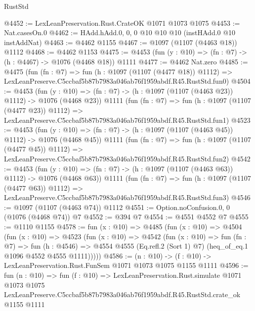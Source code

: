 \begin{lexlean}{RustStd}
\begin{coremodule}
@4452 := LexLeanPreservation.Rust.CrateOK @1071 @1073 @1075
@4453 := Nat.casesOn.{0}
@4462 := HAdd.hAdd.{0, 0, 0} @10 @10 @10 (instHAdd.{0} @10 instAddNat)
@4463 := @4462 @1155
@4467 := @1097 (@1107 (@4463 @18)) @1112
@4468 := @4462 @1153
@4475 := @4453 (fun (y : @10) => (fn : @7) -> (h : @4467) -> @1076 (@4468 @18)) @1111
@4477 := @4462 Nat.zero
@4485 := @4475
    (fun (fn : @7) =>
    fun (h : @1097 (@1107 (@4477 @18)) @1112) =>
    LexLeanPreserve.C5ccbaf5b87b7983a046ab76f1959abdf.R45.RustStd.fun0)
@4504 := @4453
    (fun (y : @10) => (fn : @7) -> (h : @1097 (@1107 (@4463 @23)) @1112) -> @1076 (@4468 @23))
    @1111
    (fun (fn : @7) =>
    fun (h : @1097 (@1107 (@4477 @23)) @1112) =>
    LexLeanPreserve.C5ccbaf5b87b7983a046ab76f1959abdf.R45.RustStd.fun1)
@4523 := @4453
    (fun (y : @10) => (fn : @7) -> (h : @1097 (@1107 (@4463 @45)) @1112) -> @1076 (@4468 @45))
    @1111
    (fun (fn : @7) =>
    fun (h : @1097 (@1107 (@4477 @45)) @1112) =>
    LexLeanPreserve.C5ccbaf5b87b7983a046ab76f1959abdf.R45.RustStd.fun2)
@4542 := @4453
    (fun (y : @10) => (fn : @7) -> (h : @1097 (@1107 (@4463 @63)) @1112) -> @1076 (@4468 @63))
    @1111
    (fun (fn : @7) =>
    fun (h : @1097 (@1107 (@4477 @63)) @1112) =>
    LexLeanPreserve.C5ccbaf5b87b7983a046ab76f1959abdf.R45.RustStd.fun3)
@4546 := @1097 (@1107 (@4463 @74)) @1112
@4551 := Option.noConfusion.{0, 0} (@1076 (@4468 @74)) @7
@4552 := @394 @7
@4554 := @4551 @4552 @7
@4555 := @1110 @1155
@4578 := fun (x : @10) =>
  @4485
    (fun (x : @10) =>
    @4504
      (fun (x : @10) =>
      @4523
        (fun (x : @10) =>
        @4542
          (fun (x : @10) =>
          fun (fn : @7) =>
          fun (h : @4546) =>
          @4554 @4555 (Eq.refl.{2} (Sort 1) @7) (heq_of_eq.{1} @1096 @4552 @4555 @1111)))))
@4586 := (n : @10) -> (f : @10) -> LexLeanPreservation.Rust.FunSem @1071 @1073 @1075 @1155 @1111
@4596 := fun (n : @10) =>
  fun (f : @10) =>
  LexLeanPreservation.Rust.simulate
    @1071
    @1073
    @1075
    LexLeanPreserve.C5ccbaf5b87b7983a046ab76f1959abdf.R45.RustStd.crate_ok
    @1155
    @1111
\end{coremodule}
\end{lexlean}
